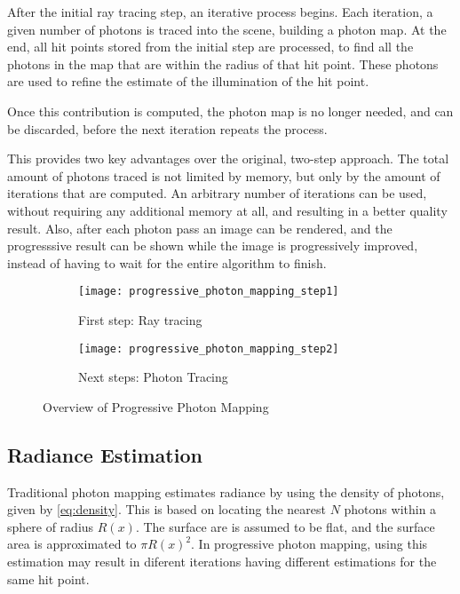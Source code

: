 \documentclass[main.tex]{subfiles}
\begin{document}
After the initial ray tracing step, an iterative process begins. Each iteration, a given number of photons is traced into the scene, building a photon map. At the end, all hit points stored from the initial step are processed, to find all the photons in the map that are within the radius of that hit point. These photons are used to refine the estimate of the illumination of the hit point.

Once this contribution is computed, the photon map is no longer needed, and can be discarded, before the next iteration repeats the process.

This provides two key advantages over the original, two-step approach. The total amount of photons traced is not limited by memory, but only by the amount of iterations that are computed. An arbitrary number of iterations can be used, without requiring any additional memory at all, and resulting in a better quality result. Also, after each photon pass an image can be rendered, and the progresssive result can be shown while the image is progressively improved, instead of having to wait for the entire algorithm to finish.

\begin{figure}
  \centering
  \begin{subfigure}{.5\textwidth}
    \centering
    \texttt{[image: progressive\_photon\_mapping\_step1]}
    \caption{First step: Ray tracing \label{fig:ppm_step1}}
  \end{subfigure}%
  \begin{subfigure}{.5\textwidth}
    \centering
    \texttt{[image: progressive\_photon\_mapping\_step2]}
    \caption{Next steps: Photon Tracing \label{fig:ppm_step2}}
  \end{subfigure}
  \caption{Overview of Progressive Photon Mapping \label{fig:ppm_overview}}
\end{figure}


\subsection{Radiance Estimation}

Traditional photon mapping estimates radiance by using the density of photons, given by \cref{eq:density}. This is based on locating the nearest $N$ photons within a sphere of radius $R(x)$. The surface are is assumed to be flat, and the surface area is approximated to $\pi R(x)^{2}$. In progressive photon mapping, using this estimation may result in diferent iterations having different estimations for the same hit point.
\end{document}
